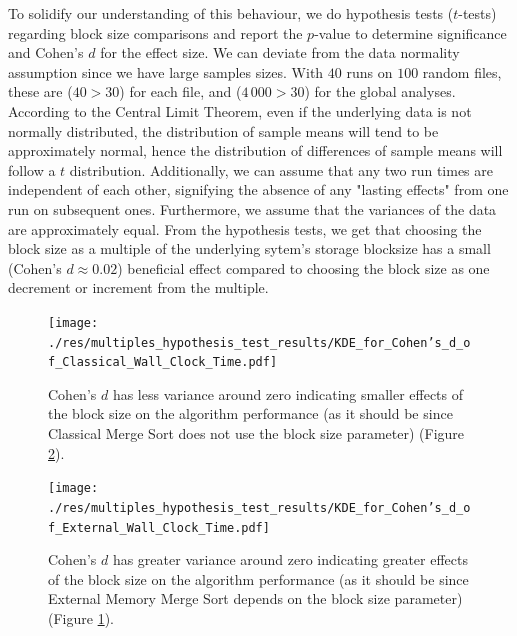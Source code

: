 \documentclass[twocolumn]{article}
\begin{document}
To solidify our understanding of this behaviour, we do hypothesis tests (\( t \)-tests) regarding block size comparisons and report the \( p \)-value to determine significance and Cohen's \( d \) for the effect size.
We can deviate from the data normality assumption since we have large samples sizes.
With \( 40 \) runs on \( 100 \) random files, these are (\(40 > 30 \)) for each file, and (\(4\,000 > 30 \)) for the global analyses.
According to the Central Limit Theorem, even if the underlying data is not normally distributed, the distribution of sample means will tend to be approximately normal, hence the
distribution of differences of sample means will follow a \( t \) distribution.
Additionally, we can assume that any two run times are independent of each other, signifying the absence of any "lasting effects" from one run on subsequent ones.
Furthermore, we assume that the variances of the data are approximately equal. From the hypothesis tests, we get that choosing the block size as a multiple of the underlying sytem's storage blocksize
has a small (Cohen's \( d \approx 0.02 \)) beneficial effect compared to choosing the block size as one decrement or increment from the multiple.

\begin{figure}[htb]
    \begin{minipage}{0.475 \textwidth}
        \centering
        \texttt{[image: ./res/multiples\_hypothesis\_test\_results/KDE\_for\_Cohen's\_d\_of\_Classical\_Wall\_Clock\_Time.pdf]}
        \caption{Cohen's \(d\) has less variance around zero indicating smaller effects of the block size on the algorithm performance (as it should be since Classical Merge Sort does not use the block size parameter)
            (Figure \ref{fig:KDE_for_Cohen's_d_of_External_Wall_Clock_Time.pdf}).}
        \label{fig:KDE_for_Cohen's_d_of_Classical_Wall_Clock_Time.pdf}
    \end{minipage}
\end{figure}

\begin{figure}[htb]
    \begin{minipage}{0.475 \textwidth}
        \centering
        \texttt{[image: ./res/multiples\_hypothesis\_test\_results/KDE\_for\_Cohen's\_d\_of\_External\_Wall\_Clock\_Time.pdf]}
        \caption{Cohen's \(d\) has greater variance around zero indicating greater effects of the block size on the algorithm performance (as it should be since
            External Memory Merge Sort depends on the block size parameter)
            (Figure \ref{fig:KDE_for_Cohen's_d_of_Classical_Wall_Clock_Time.pdf}).}
        \label{fig:KDE_for_Cohen's_d_of_External_Wall_Clock_Time.pdf}
    \end{minipage}
\end{figure}
\end{document}
